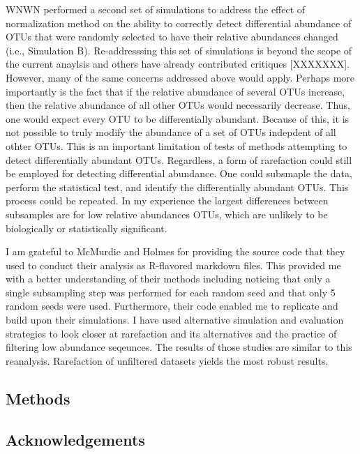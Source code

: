 \documentclass[
]{article}
\begin{document}
WNWN performed a second set of simulations to address the effect of
normalization method on the ability to correctly detect differential
abundance of OTUs that were randomly selected to have their relative
abundances changed (i.e., Simulation B). Re-addresssing this set of
simulations is beyond the scope of the current anaylsis and others have
already contributed critiques {[}XXXXXXX{]}. However, many of the same
concerns addressed above would apply. Perhaps more importantly is the
fact that if the relative abundance of several OTUs increase, then the
relative abundance of all other OTUs would necessarily decrease. Thus,
one would expect every OTU to be differentially abundant. Because of
this, it is not possible to truly modify the abundance of a set of OTUs
indepdent of all othter OTUs. This is an important limitation of tests
of methods attempting to detect differentially abundant OTUs.
Regardless, a form of rarefaction could still be employed for detecting
differential abundance. One could subsmaple the data, perform the
statistical test, and identify the differentially abundant OTUs. This
process could be repeated. In my experience the largest differences
between subsamples are for low relative abundances OTUs, which are
unlikely to be biologically or statistically significant.

I am grateful to McMurdie and Holmes for providing the source code that
they used to conduct their analysis as R-flavored markdown files. This
provided me with a better understanding of their methods including
noticing that only a single subsampling step was performed for each
random seed and that only 5 random seeds were used. Furthermore, their
code enabled me to replicate and build upon their simulations. I have
used alternative simulation and evaluation strategies to look closer at
rarefaction and its alternatives and the practice of filtering low
abundance seqeunces. The results of those studies are similar to this
reanalysis. Rarefaction of unfiltered datasets yields the most robust
results.

\hypertarget{methods}{%
\subsection{Methods}\label{methods}}

\hypertarget{acknowledgements}{%
\subsection{Acknowledgements}\label{acknowledgements}}
\end{document}
